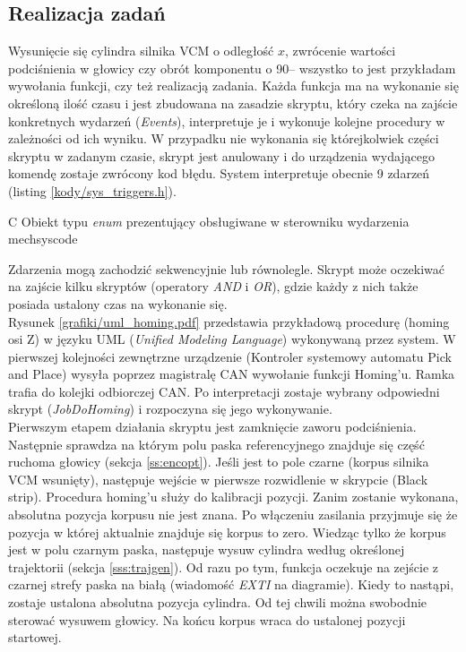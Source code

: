 \subsection{Realizacja zadań}

Wysunięcie się cylindra silnika VCM o odległość $ x $, zwrócenie wartości podciśnienia w głowicy czy obrót komponentu o 90\degree -- wszystko to jest przykładam wywołania funkcji, czy też realizacją zadania. Każda funkcja ma na wykonanie się określoną ilość czasu i jest zbudowana na zasadzie skryptu, który czeka na zajście konkretnych wydarzeń ({\it Events}), interpretuje je i wykonuje kolejne procedury w zależności od ich wyniku. W przypadku nie wykonania się którejkolwiek części skryptu w zadanym czasie, skrypt jest anulowany i do urządzenia wydającego komendę zostaje zwrócony kod błędu. System interpretuje obecnie 9 zdarzeń (listing \ref{kody/sys_triggers.h}).

		   {C}
		   {Obiekt typu {\it enum} prezentujący obsługiwane w sterowniku wydarzenia}
		   {mechsyscode}

Zdarzenia mogą zachodzić sekwencyjnie lub równolegle. Skrypt może oczekiwać na zajście kilku skryptów (operatory {\it AND} i {\it OR}), gdzie każdy z nich także posiada ustalony czas na wykonanie się. \\

Rysunek \ref{grafiki/uml_homing.pdf} przedstawia przykładową procedurę (homing osi Z) w języku UML ({\it Unified Modeling Language}) wykonywaną przez system. W pierwszej kolejności zewnętrzne urządzenie (Kontroler systemowy automatu Pick and Place) wysyła poprzez magistralę CAN wywołanie funkcji Homing'u. Ramka trafia do kolejki odbiorczej CAN. Po interpretacji zostaje wybrany odpowiedni skrypt ({\it JobDoHoming}) i rozpoczyna się jego wykonywanie. \\

Pierwszym etapem działania skryptu jest zamknięcie zaworu podciśnienia. Następnie sprawdza na którym polu paska referencyjnego znajduje się część ruchoma głowicy (sekcja \ref{ss:encopt}). Jeśli jest to pole czarne (korpus silnika VCM wsunięty), następuje wejście w pierwsze rozwidlenie w skrypcie (Black strip). Procedura homing'u służy do kalibracji pozycji. Zanim zostanie wykonana, absolutna pozycja korpusu nie jest znana. Po włączeniu zasilania przyjmuje się że pozycja w której aktualnie znajduje się korpus to zero. Wiedząc tylko że korpus jest w polu czarnym paska, następuje wysuw cylindra według określonej trajektorii (sekcja \ref{sss:trajgen}). Od razu po tym, funkcja oczekuje na zejście z czarnej strefy paska na białą (wiadomość {\it EXTI} na diagramie). Kiedy to nastąpi, zostaje ustalona absolutna pozycja cylindra. Od tej chwili można swobodnie sterować wysuwem głowicy. Na końcu korpus wraca do ustalonej pozycji startowej.

